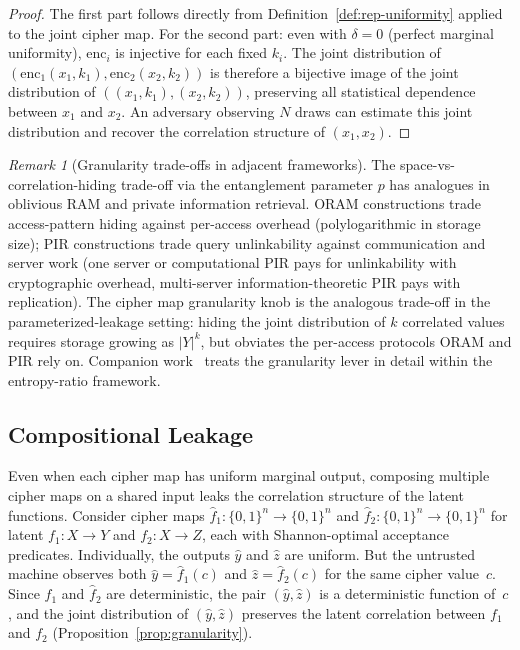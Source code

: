 \documentclass[11pt]{article}
\theoremstyle{definition}
\theoremstyle{plain}
\theoremstyle{remark}
\newtheorem{remark}{Remark}[section]
\newcommand{\fhat}{\hat{f}}
\newcommand{\enc}{\mathrm{enc}}
\begin{document}
\begin{proof}
The first part follows directly from Definition~\ref{def:rep-uniformity}
applied to the joint cipher map.  For the second part: even with $\delta=0$
(perfect marginal uniformity), $\enc_i$ is injective for each fixed $k_i$.
The joint distribution of $(\enc_1(x_1, k_1), \enc_2(x_2, k_2))$ is
therefore a bijective image of the joint distribution of
$((x_1, k_1), (x_2, k_2))$, preserving all statistical dependence between
$x_1$ and $x_2$.  An adversary observing $N$ draws can estimate this joint
distribution and recover the correlation structure of $(x_1, x_2)$.
\end{proof}

\begin{remark}[Granularity trade-offs in adjacent frameworks]
The space-vs-correlation-hiding trade-off via the entanglement parameter
$p$ has analogues in oblivious RAM and private information retrieval.
ORAM constructions trade access-pattern hiding against per-access
overhead (polylogarithmic in storage size); PIR constructions trade
query unlinkability against communication and server work (one server
or computational PIR pays for unlinkability with cryptographic
overhead, multi-server information-theoretic PIR pays with replication).
The cipher map granularity knob is the analogous trade-off in the
parameterized-leakage setting: hiding the joint distribution of $k$
correlated values requires storage growing as $|Y|^k$, but obviates the
per-access protocols ORAM and PIR rely on.  Companion
work~\cite{towell2026maxconf} treats the granularity lever in detail
within the entropy-ratio framework.
\end{remark}

\subsection{Compositional Leakage}
\label{subsec:comp-leakage}

Even when each cipher map has uniform marginal output, composing multiple
cipher maps on a shared input leaks the correlation structure of the latent
functions.  Consider cipher maps $\fhat_1 : \{0,1\}^n \to \{0,1\}^n$ and
$\fhat_2 : \{0,1\}^n \to \{0,1\}^n$ for latent $f_1 : X \to Y$ and
$f_2 : X \to Z$, each with Shannon-optimal acceptance predicates.
Individually, the outputs $\hat{y}$ and $\hat{z}$ are uniform.  But the
untrusted machine observes both $\hat{y} = \fhat_1(c)$ and
$\hat{z} = \fhat_2(c)$ for the same cipher value~$c$.  Since $\fhat_1$ and
$\fhat_2$ are deterministic, the pair $(\hat{y}, \hat{z})$ is a
deterministic function of~$c$, and the joint distribution of
$(\hat{y}, \hat{z})$ preserves the latent correlation between $f_1$ and
$f_2$ (Proposition~\ref{prop:granularity}).
\end{document}
